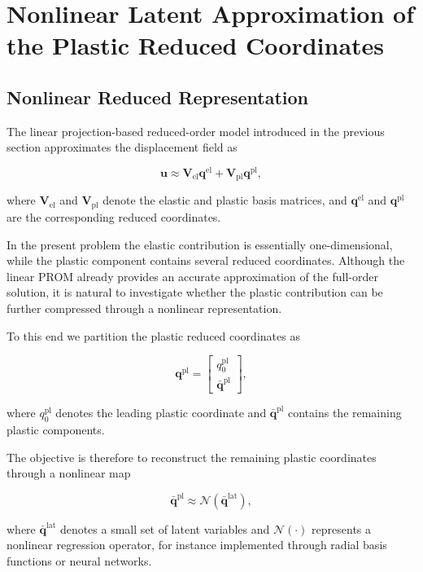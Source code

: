 \documentclass[11pt,a4paper]{article}
\begin{document}
\section{Nonlinear Latent Approximation of the Plastic Reduced Coordinates}

\subsection{Nonlinear Reduced Representation}

The linear projection-based reduced-order model introduced in the previous section approximates the displacement field as

\[
\mathbf{u}
\approx
\mathbf{V}_{\mathrm{el}} \mathbf{q}^{\mathrm{el}}
+
\mathbf{V}_{\mathrm{pl}} \mathbf{q}^{\mathrm{pl}},
\]

where $\mathbf{V}_{\mathrm{el}}$ and $\mathbf{V}_{\mathrm{pl}}$ denote the elastic and plastic basis matrices, and $\mathbf{q}^{\mathrm{el}}$ and $\mathbf{q}^{\mathrm{pl}}$ are the corresponding reduced coordinates.

In the present problem the elastic contribution is essentially one-dimensional, while the plastic component contains several reduced coordinates. Although the linear PROM already provides an accurate approximation of the full-order solution, it is natural to investigate whether the plastic contribution can be further compressed through a nonlinear representation.

To this end we partition the plastic reduced coordinates as

\[
\mathbf{q}^{\mathrm{pl}}
=
\begin{bmatrix}
q^{\mathrm{pl}}_0 \\
\bar{\mathbf{q}}^{\mathrm{pl}}
\end{bmatrix},
\]

where $q^{\mathrm{pl}}_0$ denotes the leading plastic coordinate and $\bar{\mathbf{q}}^{\mathrm{pl}}$ contains the remaining plastic components.

The objective is therefore to reconstruct the remaining plastic coordinates through a nonlinear map

\[
\bar{\mathbf{q}}^{\mathrm{pl}}
\approx
\mathcal{N}(\bar{\mathbf{q}}^{\mathrm{lat}}),
\]

where $\bar{\mathbf{q}}^{\mathrm{lat}}$ denotes a small set of latent variables and $\mathcal{N}(\cdot)$ represents a nonlinear regression operator, for instance implemented through radial basis functions or neural networks.
\end{document}
